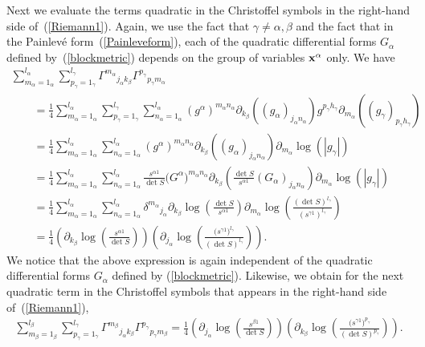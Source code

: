 \documentclass[pdftex]{sigma}
\numberwithin{equation}{section}
\newcommand{\jalpha}{j_{\alpha}}
\newcommand{\kbeta}{k_{\beta}}
\newcommand{\pgamma}{p_{\gamma}}
\newcommand{\malpha}{m_{\alpha}}
\newcommand{\mbeta}{m_{\beta}}
\newcommand{\lbeta}{l_{\beta}}
\newcommand{\lalpha}{l_{\alpha}}
\newcommand{\lgamma}{l_{\gamma}}
\newcommand{\nalpha}{n_{\alpha}}
\newcommand{\hgamma}{h_{\gamma}}
\begin{document}
Next we evaluate the terms quadratic in the Christoffel symbols in the right-hand side of~(\ref{Riemann1}). Again, we use the fact that $\gamma\neq \alpha, \beta$ and the fact that in the Painlev\'e form~(\ref{Painleveform}), each of the quadratic differential forms $G_{\alpha}$ defined by~(\ref{blockmetric}) depends on the group of variables ${\bf x}^{\alpha}$ only. We have
\begin{gather}
\sum_{\malpha=1_{\alpha}}^{\lalpha} \sum_{\pgamma = 1_{\gamma}}^{\lgamma}{\Gamma^{\malpha}}_{\jalpha \kbeta}{\Gamma^{\pgamma}}_{\pgamma \malpha}\nonumber\\
\qquad{} =\frac{1}{4}\sum_{\malpha = 1_{\alpha}}^{l_{\alpha}} \sum_{\pgamma = 1_{\gamma}}^{\lgamma}\sum_{\nalpha=1_{\alpha}}^{l_{\alpha}}(g^{\alpha})^{\malpha \nalpha}\partial_{\kbeta}((g_{\alpha})_{\jalpha \nalpha})g^{\pgamma \hgamma}\partial_{\malpha}((g_{\gamma})_{\pgamma \hgamma})\nonumber\\
\qquad{} =\frac{1}{4}\sum_{\malpha=1_{\alpha}}^{l_{\alpha}}\sum_{\nalpha=1_{\alpha}}^{l_{\alpha}}(g^{\alpha})^{\malpha \nalpha}\partial_{\kbeta}((g_{\alpha})_{\jalpha \nalpha})\partial_{\malpha}\log(|g_{\gamma}|)\nonumber\\
\qquad{} =\frac{1}{4}\sum_{\malpha=1_{\alpha}}^{l_{\alpha}}\sum_{\nalpha=1_{\alpha}}^{l_{\alpha}}\frac{s^{\alpha 1}}{\det S}\big(G^{\alpha}\big)^{\malpha \nalpha}\partial_{\kbeta}\left(\frac{\det S}{s^{\alpha 1}}(G_{\alpha})_{\jalpha \nalpha}\right)\partial_{\malpha}\log(|g_{\gamma}|)\nonumber\\
\qquad{} =\frac{1}{4}\sum_{\malpha=1_{\alpha}}^{l_{\alpha}}\sum_{\nalpha=1_{\alpha}}^{l_{\alpha}}{\delta^{\malpha}}_{\jalpha}\partial_{\kbeta}\log\left(\frac{\det S}{s^{\alpha 1}}\right)\partial_{\malpha}\log \left(\frac{(\det S)^{\lgamma}}{(s^{\gamma 1})^{\lgamma}}\right)\nonumber\\
\qquad{} =\frac{1}{4}\left(\partial_{\kbeta}\log\left(\frac{s^{\alpha 1}}{\det S}\right)\right)\left(\partial_{\jalpha}\log \left(\frac{\big(s^{\gamma 1}\big)^{\lgamma}}{(\det S)^{\lgamma}}\right)\right).\label{quadr1}
\end{gather}
We notice that the above expression is again independent of the quadratic differential forms $G_{\alpha}$ defined by (\ref{blockmetric}). Likewise, we obtain for the next quadratic term in the Christoffel symbols that appears in the right-hand side of~(\ref{Riemann1}),
\begin{gather}\label{quadr2}
\sum_{\mbeta=1_{\beta}}^{\lbeta} \sum_{\pgamma = 1_{\gamma}}^{\lgamma}{\Gamma^{\mbeta}}_{\jalpha \kbeta}{\Gamma^{\pgamma}}_{\pgamma \mbeta}=\frac{1}{4}\left(\partial_{\jalpha}\log\left(\frac{s^{\beta 1}}{\det S}\right)\right)\left(\partial_{\kbeta}\log \left(\frac{\big(s^{\gamma 1}\big)^{\pgamma}}{(\det S)^{\pgamma}}\right)\right).
\end{gather}
\end{document}
